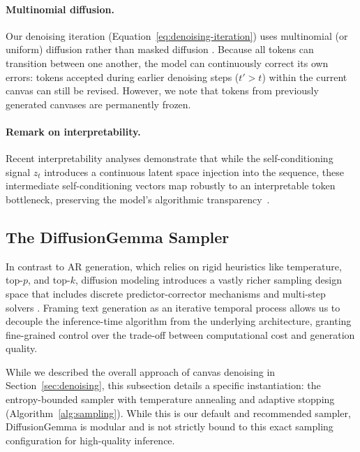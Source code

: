 \documentclass[11pt, a4paper, logo, copyright, gdm]{google}
\begin{document}
\paragraph{Multinomial diffusion.} Our denoising iteration (Equation~\ref{eq:denoising-iteration}) uses multinomial (or uniform) diffusion rather than masked diffusion \citep{hoogeboom2021argmax, austin2021structured}. Because all tokens can transition between one another, the model can continuously correct its own errors: tokens accepted during earlier denoising steps ($t' > t$) within the current canvas can still be revised. However, we note that tokens from previously generated canvases are permanently frozen.

\paragraph{Remark on interpretability.} Recent interpretability analyses demonstrate that while the self-conditioning signal $z_t$ introduces a continuous latent space injection into the sequence, these intermediate self-conditioning vectors map robustly to an interpretable token bottleneck, preserving the model's algorithmic transparency~\citep{engels2026how, asaria2026neither}.


\subsection{The DiffusionGemma Sampler}
\label{sec:sampling}

In contrast to AR generation, which relies on rigid heuristics like temperature, top-$p$, and top-$k$, diffusion modeling introduces a vastly richer sampling design space that includes discrete predictor-corrector mechanisms and multi-step solvers \citep{lezama2023predictor, deschenaux2026diffusion, liu2026nisampling, yao2026accelerating, ren2025fast}. Framing text generation as an iterative temporal process allows us to decouple the inference-time algorithm from the underlying architecture, granting fine-grained control over the trade-off between computational cost and generation quality. 

While we described the overall approach of canvas denoising in Section~\ref{sec:denoising}, this subsection details a specific instantiation: the entropy-bounded sampler \citep{ben2026accelerated} with temperature annealing and adaptive stopping (Algorithm~\ref{alg:sampling}). While this is our default and recommended sampler, DiffusionGemma is modular and is not strictly bound to this exact sampling configuration for high-quality inference.
\end{document}
